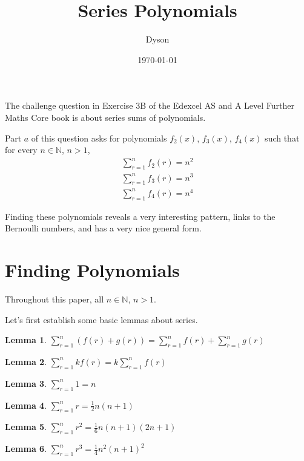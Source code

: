 \documentclass[a4paper]{article}
\title{Series Polynomials}
\author{Dyson}
\date{\today}
\newcommand{\sn}{\sum\limits_{r=1}^{n}}
\newcommand{\inn}{\in \mathbb{N}}
\newcommand{\oo}[1]{\frac{1}{#1}}
\newtheorem{lemma}{Lemma}
\begin{document}
\maketitle

\setlength{\parindent}{0em}
\setlength{\parskip}{1em}

The challenge question in Exercise 3B of the Edexcel AS and A Level Further Maths Core book is about series sums of polynomials.

Part $a$ of this question asks for polynomials $f_2(x)$, $f_3(x)$, $f_4(x)$ such that for every $n \inn$, $n > 1$,
\begin{gather*}
\sn f_2(r) = n^2\\
\sn f_3(r) = n^3\\
\sn f_4(r) = n^4
\end{gather*}

Finding these polynomials reveals a very interesting pattern, links to the Bernoulli numbers, and has a very nice general form.

\section{Finding Polynomials}

Throughout this paper, all $n \inn$, $n > 1$.

Let's first establish some basic lemmas about series.

\begin{lemma}
$\displaystyle \sn (f(r) + g(r)) = \sn f(r) + \sn g(r)$
\label{lem:add}
\end{lemma}

\begin{lemma}
$\displaystyle \sn kf(r) = k \sn f(r)$
\label{lem:mult}
\end{lemma}

\begin{lemma}
$\displaystyle \sn 1 = n$
\label{lem:sum_1}
\end{lemma}

\begin{lemma}
$\displaystyle \sn r = \oo{2}n(n + 1)$
\label{lem:sum_r}
\end{lemma}

\begin{lemma}
$\displaystyle \sn r^2 = \oo{6}n(n + 1)(2n + 1)$
\label{lem:sum_r2}
\end{lemma}

\begin{lemma}
$\displaystyle \sn r^3 = \oo{4}n^2(n + 1)^2$
\label{lem:sum_r3}
\end{lemma}
\end{document}
